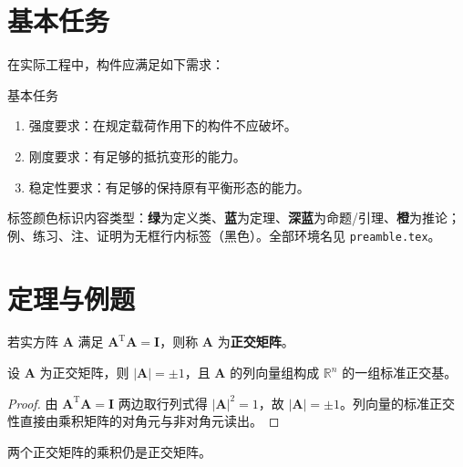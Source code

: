 \section{基本任务}
在实际工程中，构件应满足如下需求：
\begin{myTheorem}{基本任务}
	\begin{enumerate}
	\item 强度要求：在规定载荷作用下的构件不应破坏。
	\item 刚度要求：有足够的抵抗变形的能力。
	\item 稳定性要求：有足够的保持原有平衡形态的能力。
	\end{enumerate}
\end{myTheorem}

\begin{tipbox}[如何使用这些环境]
标签颜色标识内容类型：\textbf{绿}为定义类、\textbf{蓝}为定理、\textbf{深蓝}为命题/引理、\textbf{橙}为推论；例、练习、注、证明为无框行内标签（黑色）。全部环境名见 \texttt{preamble.tex}。
\end{tipbox}

\section{定理与例题}
\begin{definition}[正交矩阵]
若实方阵 $\boldsymbol{A}$ 满足 $\boldsymbol{A}^{\mathrm{T}}\boldsymbol{A}=\boldsymbol{I}$，则称 $\boldsymbol{A}$ 为\textbf{正交矩阵}。
\end{definition}

\begin{theorem}[正交矩阵的性质]
设 $\boldsymbol{A}$ 为正交矩阵，则 $|\boldsymbol{A}|=\pm1$，且 $\boldsymbol{A}$ 的列向量组构成 $\mathbb{R}^{n}$ 的一组标准正交基。
\end{theorem}
\begin{proof}
由 $\boldsymbol{A}^{\mathrm{T}}\boldsymbol{A}=\boldsymbol{I}$ 两边取行列式得 $|\boldsymbol{A}|^{2}=1$，故 $|\boldsymbol{A}|=\pm1$。列向量的标准正交性直接由乘积矩阵的对角元与非对角元读出。
\end{proof}

\begin{proposition}
两个正交矩阵的乘积仍是正交矩阵。
\end{proposition}

